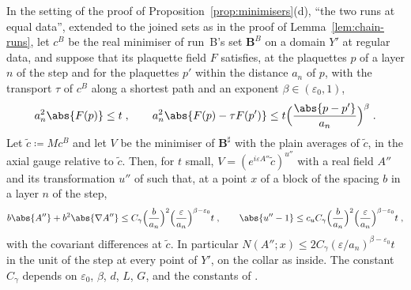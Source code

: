 \begin{lemma}\label{lem:equal-data-step}
In the setting of the proof of Proposition~\ref{prop:minimisers}(d), ``the two runs at equal data'', extended to the joined sets as in the proof of Lemma~\ref{lem:chain-runs}, let $c^B$ be the real minimiser of run~B's set $\mathbf B^B$ on a domain $Y'$ at regular data, and suppose that its plaquette field $F$ satisfies, at the plaquettes $p$ of a layer $n$ of the step and for the plaquettes $p'$ within the distance $a_n$ of $p$, with the transport $\tau$ of $c^B$ along a shortest path and an exponent $\beta \in (\varepsilon_0, 1)$,
\[
    a_n^2\abs{F(p)} \leq t\;,
    \qquad
    a_n^2\abs{F(p) - \tau F(p')} \leq t\Bigl(\frac{\abs{p - p'}}{a_n}\Bigr)^\beta\;.
\]
Let $\tilde c \coloneqq Mc^B$ and let $V$ be the minimiser of $\mathbf B^\sharp$ with the plain averages of $\tilde c$, in the axial gauge relative to $\tilde c$. Then, for $t$ small, $V = (e^{i\varepsilon A''}\tilde c)^{u''}$ with a real field $A''$ and its transformation $u''$ of \cite[(106)]{BalabanAVG} such that, at a point $x$ of a block of the spacing $b$ in a layer $n$ of the step,
\[
    b\abs{A''} + b^2\abs{\nabla A''} \leq C_\gamma\Bigl(\frac{b}{a_n}\Bigr)^2\Bigl(\frac{\varepsilon}{a_n}\Bigr)^{\beta-\varepsilon_0}t\;,
    \qquad
    \abs{u'' - 1} \leq c_uC_\gamma\Bigl(\frac{b}{a_n}\Bigr)^2\Bigl(\frac{\varepsilon}{a_n}\Bigr)^{\beta-\varepsilon_0}t\;,
\]
with the covariant differences at $\tilde c$. In particular $N(A''; x) \leq 2C_\gamma(\varepsilon/a_n)^{\beta-\varepsilon_0}t$ in the unit of the step at every point of $Y'$, on the collar as inside. The constant $C_\gamma$ depends on $\varepsilon_0$, $\beta$, $d$, $L$, $G$, and the constants of \cite{BalabanVAR, BalabanPBG}.
\end{lemma}

